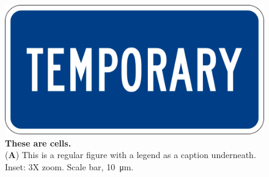 



%

%




\begin{figure}
	\centering
	\includegraphics[width=0.75\linewidth]{Figures/temp.png}
	\caption{\textbf{These are cells.}\\
		(\textbf{A}) This is a regular figure with a legend as a caption underneath. Inset: 3X zoom. Scale bar, \SI{10}{\micro\meter}.}
	\label{fig:cells}
\end{figure}

